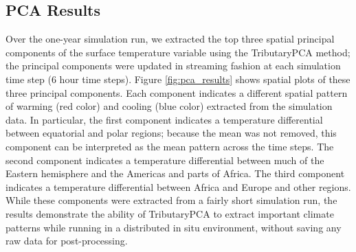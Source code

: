\documentclass{juliacon}
\begin{document}
\subsection{PCA Results}
Over the one-year simulation run, we extracted the top three spatial principal components of the surface temperature variable using the TributaryPCA method; the principal components were updated in streaming fashion at each simulation time step (6 hour time steps).
Figure \ref{fig:pca_results} shows spatial plots of these three principal components. 
Each component indicates a different spatial pattern of warming (red color) and cooling (blue color) extracted from the simulation data.
In particular, the first component indicates a temperature differential between equatorial and polar regions; because the mean was not removed, this component can be interpreted as the mean pattern across the time steps. 
The second component indicates a temperature differential between much of the Eastern hemisphere and the Americas and parts of Africa. 
The third component indicates a temperature differential between Africa and Europe and other regions.
While these components were extracted from a fairly short simulation run, the results demonstrate the ability of TributaryPCA to extract important climate patterns while running in a distributed in situ environment, without saving any raw data for post-processing.
\end{document}
